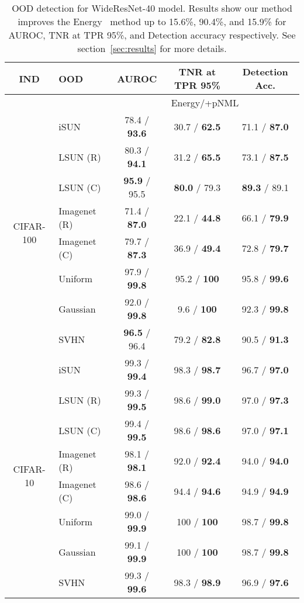\documentclass{article}
\def\secref#1{section~\ref{#1}}
\begin{document}
\begin{table}[t]
\centering
\small
\caption{OOD detection for WideResNet-40 model. Results show our method improves the Energy~\citep{liu2020energy} method up to 15.6\%, 90.4\%, and 15.9\% for AUROC, TNR at TPR 95\%, and Detection accuracy respectively. See \secref{sec:results} for more details.}
\label{tab:auroc_wrn_results}
\vspace{0.1mm}
\begin{tabular}{clccc}
\toprule
          IND & OOD &                 AUROC &        TNR at TPR 95\% &        Detection Acc. \\
 \midrule & & \multicolumn{3}{c}{Energy/+pNML} \\ \cmidrule{3-5} 

\multirow{8}{*}{CIFAR-100} & iSUN &  78.4 / \textbf{93.6} &  30.7 / \textbf{62.5} &  71.1 / \textbf{87.0} \\
          & LSUN (R) &  80.3 / \textbf{94.1} &  31.2 / \textbf{65.5} &  73.1 / \textbf{87.5} \\
          & LSUN (C) &  \textbf{95.9} / 95.5 &  \textbf{80.0} / 79.3 &  \textbf{89.3} / 89.1 \\
          & Imagenet (R) &  71.4 / \textbf{87.0} &  22.1 / \textbf{44.8} &  66.1 / \textbf{79.9} \\
          & Imagenet (C) &  79.7 / \textbf{87.3} &  36.9 / \textbf{49.4} &  72.8 / \textbf{79.7} \\
          & Uniform &  97.9 / \textbf{99.8} &   95.2 / \textbf{100} &  95.8 / \textbf{99.6} \\
          & Gaussian &  92.0 / \textbf{99.8} &    9.6 / \textbf{100} &  92.3 / \textbf{99.8} \\
          & SVHN &  \textbf{96.5} / 96.4 &  79.2 / \textbf{82.8} &  90.5 / \textbf{91.3} \\
\midrule
\multirow{8}{*}{CIFAR-10} & iSUN &  99.3 / \textbf{99.4} &  98.3 / \textbf{98.7} &  96.7 / \textbf{97.0} \\
          & LSUN (R) &  99.3 / \textbf{99.5} &  98.6 / \textbf{99.0} &  97.0 / \textbf{97.3} \\
          & LSUN (C) &  99.4 / \textbf{99.5} &  98.6 / \textbf{98.6} &  97.0 / \textbf{97.1} \\
          & Imagenet (R) &  98.1 / \textbf{98.1} &  92.0 / \textbf{92.4} &  94.0 / \textbf{94.0} \\
          & Imagenet (C) &  98.6 / \textbf{98.6} &  94.4 / \textbf{94.6} &  94.9 / \textbf{94.9} \\
          & Uniform &  99.0 / \textbf{99.9} &    100 / \textbf{100} &  98.7 / \textbf{99.8} \\
          & Gaussian &  99.1 / \textbf{99.9} &    100 / \textbf{100} &  98.7 / \textbf{99.8} \\
          & SVHN &  99.3 / \textbf{99.6} &  98.3 / \textbf{98.9} &  96.9 / \textbf{97.6} \\
\bottomrule
\end{tabular}
 \end{table}
\end{document}
